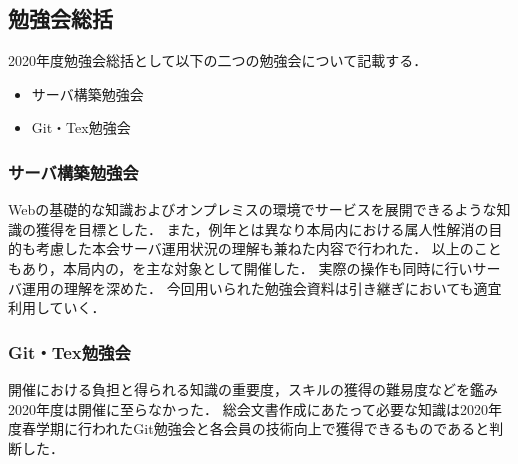 \subsection*{勉強会総括}


2020年度勉強会総括として以下の二つの勉強会について記載する．
\begin{itemize}
    \item サーバ構築勉強会
    \item Git・Tex勉強会
\end{itemize}

\subsubsection*{サーバ構築勉強会}
Webの基礎的な知識およびオンプレミスの環境でサービスを展開できるような知識の獲得を目標とした．
また，例年とは異なり本局内における属人性解消の目的も考慮した本会サーバ運用状況の理解も兼ねた内容で行われた．
以上のこともあり，本局内の\firstGrade{}，\secondGrade{}を主な対象として開催した．
実際の操作も同時に行いサーバ運用の理解を深めた．
今回用いられた勉強会資料は引き継ぎにおいても適宜利用していく．

\subsubsection*{Git・Tex勉強会}
開催における負担と得られる知識の重要度，スキルの獲得の難易度などを鑑み2020年度は開催に至らなかった．
総会文書作成にあたって必要な知識は2020年度春学期に行われたGit勉強会と各会員の技術向上で獲得できるものであると判断した．
